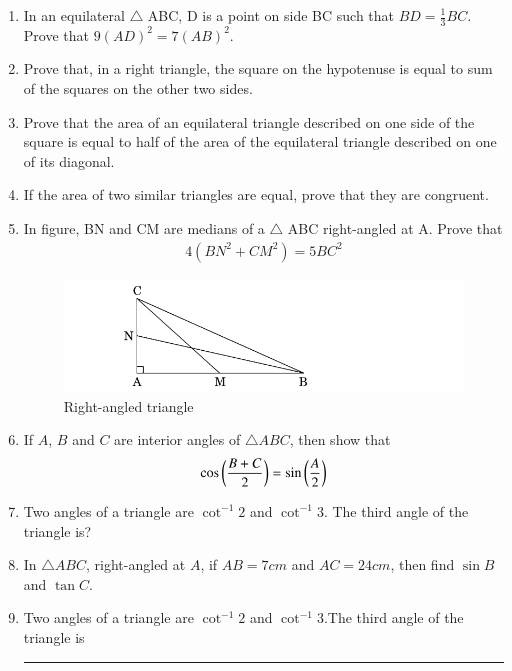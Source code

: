 \begin{enumerate}
	\item In an equilateral $\triangle$ ABC, D is a point on side BC such that $ BD =\frac{1}{3}BC$. Prove that $9(AD)^2 = 7(AB)^2$.
	\hfill{}\item Prove that, in a right triangle, the  square on the hypotenuse is equal to sum of the squares on the other two sides.
	\hfill{}\item Prove that the area of an equilateral triangle described on one side of the square is equal to half of the area of the equilateral triangle described on one of its diagonal.
	\hfill{}\item If the area of two similar triangles are equal, prove that they are congruent.
\hfill{}
\item In figure, BN and CM are medians of a $\triangle$ ABC right-angled at A. Prove that \begin{align}4(BN^2 +CM^2) = 5BC^2\end{align} 
\begin{figure}[!ht]
\centering
\includegraphics[width=\columnwidth]{cbse/figs/rightangled}
\caption{Right-angled triangle}
\label{fig:rightangled4}
\end{figure}

\hfill{}\item If $A$, $B$ and $C$ are interior angles of $ \triangle ABC$, then show that
	\begin{align}
	    \cos \left(\frac{B + C}{2}\right)=\sin \left(\frac{A}{2}\right)
	\end{align}
      
\hfill{} \item Two angles of a triangle are $\cot^{-1}2$ and $\cot^{-1}3$. The third angle of the triangle is?
    
    \hfill{}\item  In $\triangle ABC$, right-angled at $A$, if $AB=7 cm$ and $AC=24 cm$, then find $\sin B$
and $\tan C$.

\hfill{}\item Two angles of a triangle are  $\cot^{-1}2$ and $\cot^{-1}3$.The third angle of the
triangle is \rule{30pt}{1pt}


\end{enumerate}
